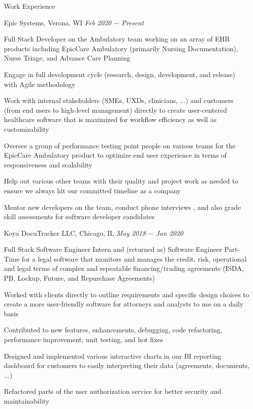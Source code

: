 \documentclass{resume}
\begin{document}
\begin{rSection}{Work Experience}

\begin{rSubsection}{Epic Systems, Verona, WI} {\textit{Feb 2020 $-$ Present}}
{}

    \item Full Stack Developer on the Ambulatory team working on an array of EHR products including EpicCare Ambulatory (primarily Nursing Documentation), Nurse Triage, and Advance Care Planning
    \item Engage in full development cycle (research, design, development, and release) with Agile methodology
    \item Work with internal stakeholders (SMEs, UXDs, clinicians, ...) and customers (from end users to high-level management) directly to create user-centered healthcare software that is maximized for workflow efficiency as well as customizability
    \item Oversee a group of performance testing point people on various teams for the EpicCare Ambulatory product to optimize end user experience in terms of responsiveness and scalability
    \item Help out various other teams with their quality and project work as needed to ensure we always hit our committed timeline as a company
    \item Mentor new developers on the team, conduct phone interviews , and also grade skill assessments for software developer candidates

\end{rSubsection}

\begin{rSubsection}{Koya DocuTracker LLC, Chicago, IL} {\textit{May 2018 $-$ Jan 2020}}
{}

    \item Full Stack Software Engineer Intern and (returned as) Software Engineer Part-Time for a legal software that monitors and manages the credit, risk, operational and legal terms of complex and repeatable financing/trading agreements (ISDA, PB, Lockup, Future, and Repurchase Agreements)
    \item Worked with clients directly to outline requirements and specific design choices to create a more user-friendly software for attorneys and analysts to use on a daily basis
    \item Contributed to new features, enhancements, debugging, code refactoring, performance improvement, unit testing, and hot fixes
    \item Designed and implemented various interactive charts in our BI reporting dashboard for customers to easily interpreting their data (agreements, documents, ...)
    \item Refactored parts of the user authorization service for better security and maintainability


\end{rSubsection}
\end{rSection}
\end{document}
